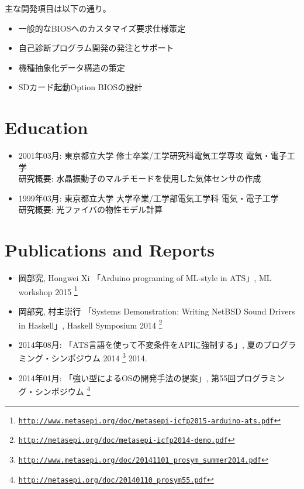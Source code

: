 \documentclass[letterpaper]{article}
\begin{document}
主な開発項目は以下の通り。
\begin{itemize}
  \item 一般的なBIOSへのカスタマイズ要求仕様策定
  \item 自己診断プログラム開発の発注とサポート
  \item 機種抽象化データ構造の策定
  \item SDカード起動Option BIOSの設計
\end{itemize}

\section*{Education}

\begin{itemize}
  \item 2001年03月: 東京都立大学 修士卒業/工学研究科電気工学専攻 電気・電子工学 \\
    研究概要: 水晶振動子のマルチモードを使用した気体センサの作成
  \item 1999年03月: 東京都立大学 大学卒業/工学部電気工学科 電気・電子工学 \\
    研究概要: 光ファイバの物性モデル計算
\end{itemize}

\section*{Publications and Reports}

\begin{itemize}
  \item 岡部究, Hongwei Xi 「Arduino programing of ML-style in ATS」, ML workshop 2015
    \footnote{\href{http://www.metasepi.org/doc/metasepi-icfp2015-arduino-ats.pdf}{\tt http://www.metasepi.org/doc/metasepi-icfp2015-arduino-ats.pdf}}
  \item 岡部究, 村主崇行 「Systems Demonstration: Writing NetBSD Sound Drivers in Haskell」, Haskell Symposium 2014
    \footnote{\href{http://metasepi.org/doc/metasepi-icfp2014-demo.pdf}{\tt http://metasepi.org/doc/metasepi-icfp2014-demo.pdf}}
  \item 2014年08月: 「ATS言語を使って不変条件をAPIに強制する」, 夏のプログラミング・シンポジウム 2014
    \footnote{\href{http://www.metasepi.org/doc/20141101\_prosym\_summer2014.pdf}{\tt http://www.metasepi.org/doc/20141101\_prosym\_summer2014.pdf}}  2014.
  \item 2014年01月: 「強い型によるOSの開発手法の提案」, 第55回プログラミング・シンポジウム
    \footnote{\href{http://metasepi.org/doc/20140110\_prosym55.pdf}{\tt http://metasepi.org/doc/20140110\_prosym55.pdf}}
\end{itemize}
\end{document}
